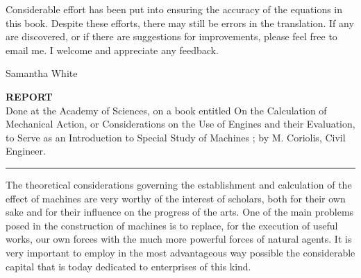 \documentclass{book}
\begin{document}
Considerable effort has been put into ensuring the accuracy of the equations in this book. Despite these efforts, there may still be errors in the translation. If any are discovered, or if there are suggestions for improvements, please feel free to email me. I welcome and appreciate any feedback.

\vfill



 \hfill Samantha White\\


\vfill


\vspace{\fill}


\newpage
{}
\textbf{REPORT}
\begingroup
\centering 
\\
Done at the Academy of Sciences, on a book entitled On the Calculation of 
Mechanical Action, or Considerations on the Use of Engines and their Evaluation, to Serve as an Introduction to Special Study of Machines ; by M. Coriolis, Civil Engineer. 
\par\noindent\rule{\textwidth}{1pt}
 \endgroup
\setlength{\parindent}{20pt}
The theoretical considerations governing the establishment and calculation of the effect of machines are very worthy of the interest of scholars, both for their own sake and for their influence on the progress of the arts. One of the main problems posed in the construction of machines is to replace, for the execution of useful works, our own forces with the much more powerful forces of natural agents. It is very important to employ in the most advantageous way possible the considerable capital that is today dedicated to enterprises of this kind.
\end{document}
